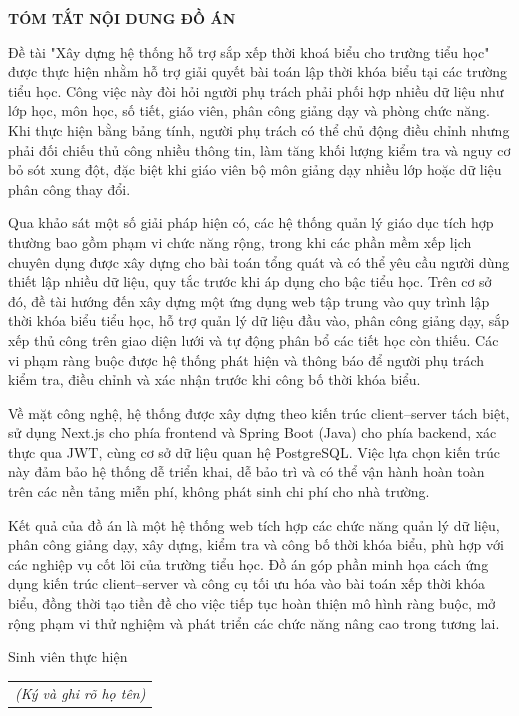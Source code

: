 \documentclass[../DoAn.tex]{subfiles}
\begin{document}
\begin{center}
    \Large{\textbf{TÓM TẮT NỘI DUNG ĐỒ ÁN}}\\
\end{center}
\vspace{1cm}

Đề tài "Xây dựng hệ thống hỗ trợ sắp xếp thời khoá biểu cho trường tiểu học" được thực hiện nhằm hỗ trợ giải quyết bài toán lập thời khóa biểu tại các trường tiểu học. Công việc này đòi hỏi người phụ trách phải phối hợp nhiều dữ liệu như lớp học, môn học, số tiết, giáo viên, phân công giảng dạy và phòng chức năng. Khi thực hiện bằng bảng tính, người phụ trách có thể chủ động điều chỉnh nhưng phải đối chiếu thủ công nhiều thông tin, làm tăng khối lượng kiểm tra và nguy cơ bỏ sót xung đột, đặc biệt khi giáo viên bộ môn giảng dạy nhiều lớp hoặc dữ liệu phân công thay đổi.

Qua khảo sát một số giải pháp hiện có, các hệ thống quản lý giáo dục tích hợp thường bao gồm phạm vi chức năng rộng, trong khi các phần mềm xếp lịch chuyên dụng được xây dựng cho bài toán tổng quát và có thể yêu cầu người dùng thiết lập nhiều dữ liệu, quy tắc trước khi áp dụng cho bậc tiểu học. Trên cơ sở đó, đề tài hướng đến xây dựng một ứng dụng web tập trung vào quy trình lập thời khóa biểu tiểu học, hỗ trợ quản lý dữ liệu đầu vào, phân công giảng dạy, sắp xếp thủ công trên giao diện lưới và tự động phân bổ các tiết học còn thiếu. Các vi phạm ràng buộc được hệ thống phát hiện và thông báo để người phụ trách kiểm tra, điều chỉnh và xác nhận trước khi công bố thời khóa biểu.

Về mặt công nghệ, hệ thống được xây dựng theo kiến trúc client–server tách biệt, sử dụng Next.js cho phía frontend và Spring Boot (Java) cho phía backend, xác thực qua JWT, cùng cơ sở dữ liệu quan hệ PostgreSQL. Việc lựa chọn kiến trúc này đảm bảo hệ thống dễ triển khai, dễ bảo trì và có thể vận hành hoàn toàn trên các nền tảng miễn phí, không phát sinh chi phí cho nhà trường.

Kết quả của đồ án là một hệ thống web tích hợp các chức năng quản lý dữ liệu, phân công giảng dạy, xây dựng, kiểm tra và công bố thời khóa biểu, phù hợp với các nghiệp vụ cốt lõi của trường tiểu học. Đồ án góp phần minh họa cách ứng dụng kiến trúc client--server và công cụ tối ưu hóa vào bài toán xếp thời khóa biểu, đồng thời tạo tiền đề cho việc tiếp tục hoàn thiện mô hình ràng buộc, mở rộng phạm vi thử nghiệm và phát triển các chức năng nâng cao trong tương lai.
\begin{flushright}
Sinh viên thực hiện\\
\begin{tabular}{@{}c@{}}
\textit{(Ký và ghi rõ họ tên)}
\end{tabular}
\end{flushright}
\end{document}
